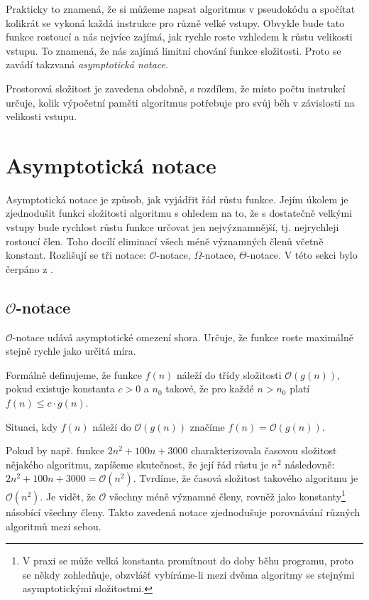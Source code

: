 \documentclass[12pt]{report}			%
\begin{document}
			
			Prakticky to znamená, že si můžeme napsat algoritmus v pseudokódu a spočítat kolikrát se vykoná každá instrukce pro různě velké vstupy. Obvykle bude tato funkce rostoucí a nás nejvíce zajímá, jak rychle roste vzhledem k růstu velikosti vstupu. To znamená, že nás zajímá limitní chování funkce složitosti. Proto se zavádí takzvaná \emph{asymptotická notace}.
			
			Prostorová složitost je zavedena obdobně, s rozdílem, že místo počtu instrukcí určuje, kolik výpočetní paměti algoritmus potřebuje pro svůj běh v závislosti na velikosti vstupu. \cite{pruvodce}
			\section{Asymptotická notace}
			Asymptotická notace je způsob, jak vyjádřit řád růstu funkce. Jejím úkolem je zjednodušit funkci složitosti algoritmu s ohledem na to, že s dostatečně velkými vstupy bude rychlost růstu funkce určovat jen nejvýznamnější, tj. nejrychleji rostoucí člen. Toho docílí eliminací všech méně významných členů včetně konstant. Rozlišují se tři notace: $\mathcal{O}$-notace, $\Omega$-notace, $\Theta$-notace. V této sekci bylo čerpáno z \cite{intro}.
			
			\subsection{$\mathcal{O}$-notace}
			
			$\mathcal{O}$-notace udává asymptotické omezení shora. Určuje, že funkce roste maximálně stejně rychle jako určitá míra.
			
			Formálně definujeme, že funkce $f(n)$ náleží do třídy složitosti $\mathcal{O}(g(n))$, pokud existuje konstanta $c > 0$ a $n_0$ takové, že pro každé $n>n_0$ platí $f(n) \leq c \cdot g(n)$.
			
			Situaci, kdy $f(n)$ náleží do $\mathcal{O}(g(n))$ značíme $f(n) = \mathcal{O}(g(n))$.
			
			Pokud by např. funkce $2n^2+100n+3000$ charakterizovala časovou složitost nějakého algoritmu, zapíšeme skutečnost, že její řád růstu je $n^2$ následovně: $2n^2+100n+3000 = \mathcal{O}(n^2)$. Tvrdíme, že časová složitost takového algoritmu je $\mathcal{O}(n^2)$. Je vidět, že $\mathcal{O}$  všechny méně významné členy, rovněž jako konstanty\footnote{V praxi se může velká konstanta promítnout do doby běhu programu, proto se někdy zohledňuje, obzvlášť vybíráme-li mezi dvěma algoritmy se stejnými asymptotickými složitostmi.} násobící všechny členy. Takto zavedená notace zjednodušuje porovnávání různých algoritmů mezi sebou.
			
\end{document}
